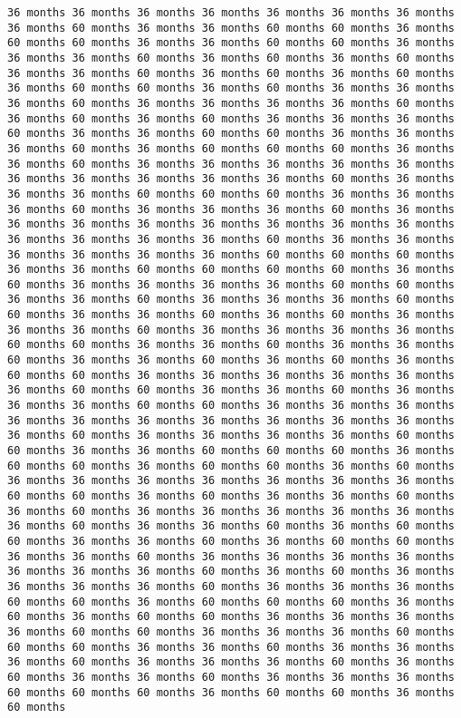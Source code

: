 \documentclass[11pt]{article}
\begin{document}
\begin{Verbatim}[commandchars=\\\{\}, frame=single, framerule=2mm, rulecolor=\color{outerrorbackground}]
36 months 36 months 36 months 36 months 36 months 36 months 36 months 36 months 60 months 36 months 36 months 60 months 60 months 36 months 60 months 60 months 36 months 36 months 60 months 60 months 36 months 36 months 36 months 60 months 36 months 60 months 36 months 60 months 36 months 36 months 60 months 36 months 60 months 36 months 60 months 36 months 60 months 60 months 36 months 60 months 36 months 36 months 36 months 60 months 36 months 36 months 36 months 36 months 60 months 36 months 60 months 36 months 60 months 36 months 36 months 36 months 60 months 36 months 36 months 60 months 60 months 36 months 36 months 36 months 60 months 36 months 60 months 60 months 60 months 36 months 36 months 60 months 36 months 36 months 36 months 36 months 36 months 36 months 36 months 36 months 36 months 36 months 60 months 36 months 36 months 36 months 60 months 60 months 60 months 36 months 36 months 36 months 60 months 36 months 36 months 36 months 60 months 36 months 36 months 36 months 36 months 36 months 36 months 36 months 36 months 36 months 36 months 36 months 36 months 60 months 36 months 36 months 36 months 36 months 36 months 36 months 60 months 60 months 60 months 36 months 36 months 60 months 60 months 60 months 60 months 36 months 60 months 36 months 36 months 36 months 36 months 60 months 60 months 36 months 36 months 60 months 36 months 36 months 36 months 60 months 60 months 36 months 36 months 60 months 36 months 60 months 36 months 36 months 36 months 60 months 36 months 36 months 36 months 36 months 60 months 60 months 36 months 36 months 60 months 36 months 36 months 60 months 36 months 36 months 60 months 36 months 60 months 36 months 60 months 60 months 36 months 36 months 36 months 36 months 36 months 36 months 60 months 60 months 36 months 36 months 60 months 36 months 36 months 36 months 60 months 60 months 36 months 36 months 36 months 36 months 36 months 36 months 36 months 36 months 36 months 36 months 36 months 60 months 36 months 36 months 36 months 36 months 60 months 60 months 36 months 36 months 60 months 60 months 60 months 36 months 60 months 60 months 36 months 60 months 60 months 36 months 60 months 36 months 36 months 36 months 36 months 36 months 36 months 36 months 60 months 60 months 36 months 60 months 36 months 36 months 60 months 36 months 60 months 36 months 36 months 36 months 36 months 36 months 36 months 60 months 36 months 36 months 60 months 36 months 60 months 60 months 36 months 36 months 60 months 36 months 60 months 60 months 36 months 36 months 60 months 36 months 36 months 36 months 36 months 36 months 36 months 36 months 60 months 36 months 60 months 36 months 36 months 36 months 36 months 60 months 36 months 36 months 36 months 60 months 60 months 36 months 60 months 60 months 60 months 36 months 60 months 36 months 60 months 60 months 36 months 36 months 36 months 36 months 60 months 60 months 36 months 36 months 36 months 60 months 60 months 60 months 36 months 36 months 60 months 36 months 36 months 36 months 60 months 36 months 36 months 36 months 60 months 36 months 60 months 36 months 36 months 60 months 36 months 36 months 36 months 60 months 60 months 60 months 36 months 60 months 60 months 36 months 60 months 
\end{Verbatim}
\end{document}
